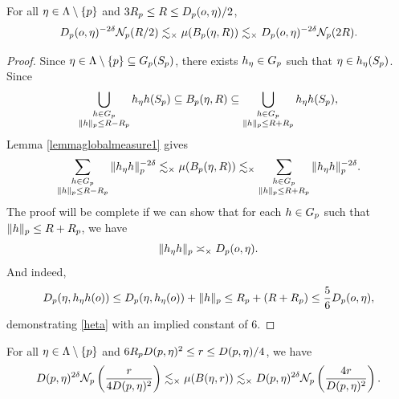 \begin{lemma}
\label{lemmaglobalmeasure2}
For all $\eta\in \Lambda\setminus\{p\}$ and $3R_p \leq R\leq D_p(o,\eta)/2$,
\[
D_p(o,\eta)^{-2\delta} \mathcal N_p(R/2) \lesssim_\times \mu(B_p(\eta,R)) \lesssim_\times D_p(o,\eta)^{-2\delta} \mathcal N_p(2R).
\]
\end{lemma}
\begin{proof}
Since $\eta\in \Lambda\setminus\{p\} \subseteq G_p(S_p)$, there exists $h_\eta\in G_p$ such that $\eta\in h_\eta(S_p)$. Since
\[
\bigcup_{\substack{h\in G_p \\ \|h\|_p \leq R - R_p}} h_\eta h(S_p) \subseteq B_p(\eta,R) \subseteq \bigcup_{\substack{h\in G_p \\ \|h\|_p \leq R + R_p}} h_\eta h(S_p),
\]
Lemma \ref{lemmaglobalmeasure1} gives
\[
\sum_{\substack{h\in G_p \\ \|h\|_p \leq R - R_p}} \|h_\eta h\|_p^{-2\delta} \lesssim_\times \mu(B_p(\eta,R)) \lesssim_\times \sum_{\substack{h\in G_p \\ \|h\|_p \leq R + R_p}} \|h_\eta h\|_p^{-2\delta}.
\]
The proof will be complete if we can show that for each $h\in G_p$ such that $\|h\|_p \leq R + R_p$, we have
\begin{equation}
\label{heta}
\|h_\eta h\|_p \asymp_\times D_p(o,\eta).
\end{equation}
And indeed,
\[
D_p(\eta,h_\eta h(o)) \leq D_p(\eta,h_\eta(o)) + \|h\|_p \leq R_p + (R + R_p) \leq \frac56 D_p(o,\eta),
\]
demonstrating \eqref{heta} with an implied constant of $6$.
\end{proof}



\begin{corollary}
\label{corollaryglobalmeasure21}
For all $\eta\in\Lambda\setminus\{p\}$ and $6R_p D(p,\eta)^2 \leq r \leq D(p,\eta)/4$, we have
\[
D(p,\eta)^{2\delta} \mathcal N_p\left(\frac{r}{4D(p,\eta)^2}\right)
\lesssim_\times \mu(B(\eta,r))
\lesssim_\times D(p,\eta)^{2\delta} \mathcal N_p\left(\frac{4r}{D(p,\eta)^2}\right).
\]
\end{corollary}


